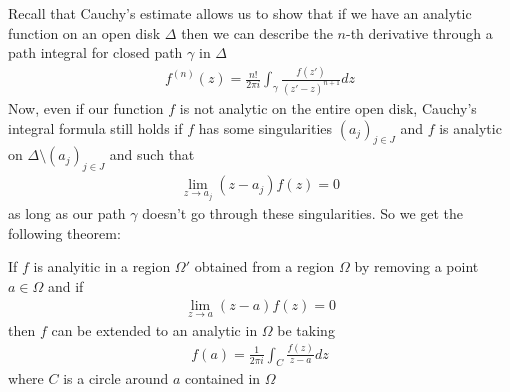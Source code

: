 Recall that Cauchy's estimate allows us to show that if we have an analytic function on an open disk $\Delta$ then we can describe the $n$-th derivative through a path integral for closed path $\gamma$ in $\Delta$
\begin{align*}
	f^{(n)}(z) = \frac{n!}{2\pi i}\int_\gamma	 \frac{f(z')}{(z'-z)^{n+1}}dz
\end{align*}
Now, even if our function $f$ is not analytic on the entire open disk, Cauchy's integral formula still holds if $f$ has some singularities $\left(a_{j}\right)_{j \in J}$ and $f$ is analytic on $\Delta \setminus \left(a_{j}\right)_{j \in J}$ and such that
\begin{align*}
	\lim_{z \to a_j} (z - a_j)f(z) = 0
\end{align*}
as long as our path $\gamma$ doesn't go through these singularities. So we get the following theorem:

\begin{theorem}
	If $f$ is analyitic in a region $\Omega'$ obtained from a region $\Omega$ by removing a point $a \in \Omega$ and if
	\begin{align*}
		\lim_{z \to a}(z-a)f(z) = 0
	\end{align*}
	then $f$ can be extended to an analytic in $\Omega$ be taking
	\begin{align*}
		f(a) = \frac{1}{2\pi i} \int_C \frac{f(z)}{z - a}d z
	\end{align*}
	where $C$ is a circle around $a$ contained in $\Omega$
\end{theorem}

